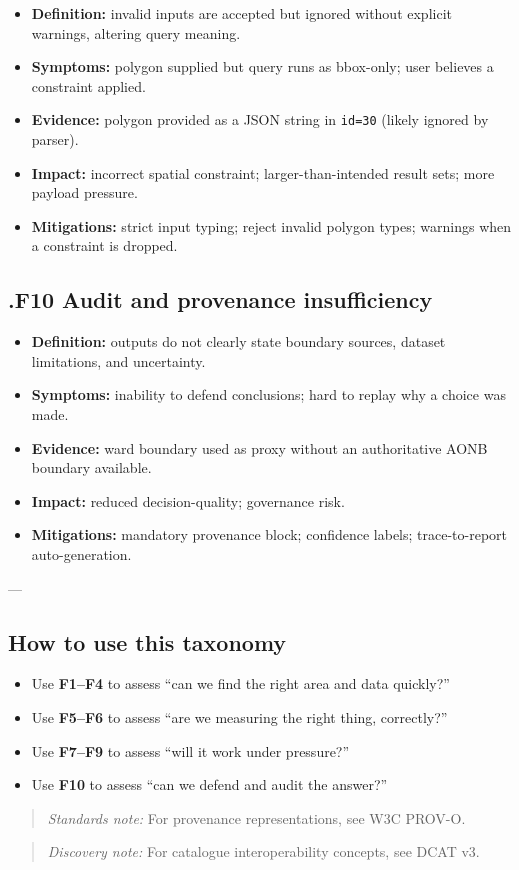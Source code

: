 \begin{itemize}[leftmargin=*]
\item \textbf{Definition:} invalid inputs are accepted but ignored without explicit warnings, altering query meaning.
\item \textbf{Symptoms:} polygon supplied but query runs as bbox-only; user believes a constraint applied.
\item \textbf{Evidence:} polygon provided as a JSON string in \texttt{id=30} (likely ignored by parser).
\item \textbf{Impact:} incorrect spatial constraint; larger-than-intended result sets; more payload pressure.
\item \textbf{Mitigations:} strict input typing; reject invalid polygon types; warnings when a constraint is dropped.
\end{itemize}

\subsection*{.F10 Audit and provenance insufficiency}

\begin{itemize}[leftmargin=*]
\item \textbf{Definition:} outputs do not clearly state boundary sources, dataset limitations, and uncertainty.
\item \textbf{Symptoms:} inability to defend conclusions; hard to replay why a choice was made.
\item \textbf{Evidence:} ward boundary used as proxy without an authoritative AONB boundary available.
\item \textbf{Impact:} reduced decision-quality; governance risk.
\item \textbf{Mitigations:} mandatory provenance block; confidence labels; trace-to-report auto-generation.
\end{itemize}

---

\subsection{How to use this taxonomy}

\begin{itemize}[leftmargin=*]
\item Use \textbf{F1–F4} to assess “can we find the right area and data quickly?”
\item Use \textbf{F5–F6} to assess “are we measuring the right thing, correctly?”
\item Use \textbf{F7–F9} to assess “will it work under pressure?”
\item Use \textbf{F10} to assess “can we defend and audit the answer?”
\end{itemize}

\begin{quote}
\textit{Standards note:} For provenance representations, see W3C PROV-O. \cite{prov_o}\\
\end{quote}

\begin{quote}
\textit{Discovery note:} For catalogue interoperability concepts, see DCAT v3. \cite{dcat3}\\
\end{quote}
